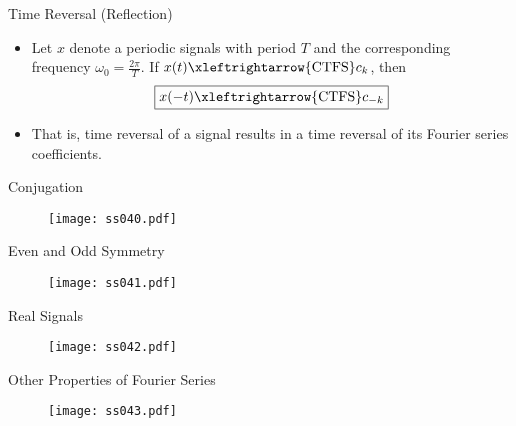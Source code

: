 
\begin{frame}{Time Reversal (Reflection)}
\begin{itemize}
\item Let $x$ denote a periodic signals with period $T$ and the corresponding frequency $\omega_0 = \frac{2\pi}{T}$. If $x(t) \xleftrightarrow{\text{CTFS}} c_k$, then
\[\boxed{x(-t)\xleftrightarrow{\text{CTFS}} c_{-k}}\]
\item That is, time reversal of a signal results in a time reversal of its Fourier series coefficients.
\end{itemize}
\end{frame}


\begin{frame}{Conjugation}
\begin{figure}
\centering
\texttt{[image: ss040.pdf]}
\end{figure}
\end{frame}


\begin{frame}{Even and Odd Symmetry}
\begin{figure}
\centering
\texttt{[image: ss041.pdf]}
\end{figure}
\end{frame}


\begin{frame}{Real Signals}
\vspace{-4pt}
\begin{figure}
\centering
\texttt{[image: ss042.pdf]}
\end{figure}
\end{frame}


\begin{frame}{Other Properties of Fourier Series}
\begin{figure}
\centering
\texttt{[image: ss043.pdf]}
\end{figure}
\end{frame}

